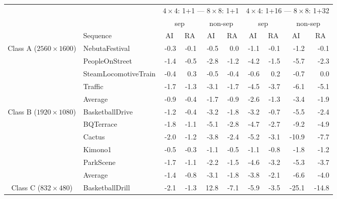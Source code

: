 \documentclass[11pt,a4paper,openright,twoside]{book}
\numberwithin{equation}{section} %
\numberwithin{figure}{section} %
\numberwithin{table}{section} %
\begin{document}
\begin{table}[tb]
	\centering
	\scriptsize
	\begin{tabularx}{\textwidth}{c|X|rr|rr|rr|rr}
		\multicolumn{2}{c}{} &
		\multicolumn{4}{c|}{$4\times4$: 1+1 --- $8\times8$: 1+1} &
		\multicolumn{4}{c}{$4\times4$: 1+16 --- $8\times8$: 1+32} \\
		\cline{3-10}
		\multicolumn{2}{c}{} &
		\multicolumn{2}{c|}{sep} &
		\multicolumn{2}{c|}{non-sep} &
		\multicolumn{2}{c|}{sep} &
		\multicolumn{2}{c}{non-sep} \\
		\cline{2-10}
		\multicolumn{1}{c}{} & {Sequence} &
		\multicolumn{1}{c}{ \acs{AI}} & \multicolumn{1}{c|}{ \acs{RA}} &
		\multicolumn{1}{c}{ \acs{AI}} & \multicolumn{1}{c|}{ \acs{RA}} &
		\multicolumn{1}{c}{ \acs{AI}} & \multicolumn{1}{c|}{ \acs{RA}} &
		\multicolumn{1}{c}{ \acs{AI}} & \multicolumn{1}{c}{ \acs{RA}} \\
		\hline
		\hline
		\multirow{5}{2cm}{\centering Class A ($2560\times1600$)}
		& NebutaFestival         & -0.3 & -0.1 & -0.5 &  0.0 & -1.1 & -0.1 &  -1.2 &  -0.1 \\
		& PeopleOnStreet         & -1.4 & -0.5 & -2.8 & -1.2 & -4.2 & -1.5 &  -5.7 &  -2.3 \\
		& SteamLocomotiveTrain   & -0.4 &  0.3 & -0.5 & -0.4 & -0.6 &  0.2 &  -0.7 &   0.0 \\
		& Traffic                & -1.7 & -1.3 & -3.1 & -1.7 & -4.5 & -3.7 &  -6.1 &  -5.1 \\
		\cline{2-10} &
		Average                  & -0.9 & -0.4 & -1.7 & -0.9 & -2.6 & -1.3 &  -3.4 &  -1.9 \\
		\hline
		\hline
		\multirow{6}{2cm}{\centering Class B ($1920\times1080$)}
		& BasketballDrive        & -1.2 & -0.4 & -3.2 & -1.8 & -3.2 & -0.7 &  -5.5 &  -2.4 \\
		& BQTerrace              & -1.8 & -1.1 & -5.1 & -2.8 & -4.7 & -2.7 &  -9.2 &  -4.9 \\
		& Cactus                 & -2.0 & -1.2 & -3.8 & -2.4 & -5.2 & -3.1 & -10.9 &  -7.7 \\
		& Kimono1                & -0.5 & -0.3 & -1.1 & -0.5 & -1.1 & -0.8 &  -1.8 &  -1.2 \\
		& ParkScene              & -1.7 & -1.1 & -2.2 & -1.5 & -4.6 & -3.2 &  -5.3 &  -3.7 \\
		\cline{2-10} &
		Average                  & -1.4 & -0.8 & -3.1 & -1.8 & -3.8 &  -2.1&  -6.6 &  -4.0 \\
		\hline
		\hline
		\multirow{5}{2cm}{\centering Class C ($832\times480$)}
		& BasketballDrill        & -2.1 & -1.3 & 12.8 & -7.1 & -5.9 & -3.5 & -25.1 & -14.8 \\

\end{tabularx}
\end{table}
\end{document}
